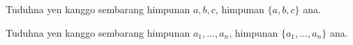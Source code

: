 \documentclass[../../../include/open-logic-section]{subfiles}
\begin{document}
\begin{prob}
Tuduhna yen kanggo sembarang himpunan $a, b, c$,
himpunan $\{a, b, c\}$ ana.
\end{prob}

\begin{prob}
Tuduhna yen kanggo sembarang himpunan $a_1, \ldots, a_n$,
himpunan $\{a_1, \ldots, a_n\}$ ana.
\end{prob}

\end{document}
